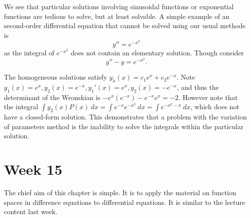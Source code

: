 \documentclass[a4paper, 12pt,oneside,openany]{book}
\begin{document}

We see that particular solutions involving sinusoidal functions or exponential functions are tedious to solve, but at least solvable. A simple example of an second-order differential equation that cannot be solved using our usual methods is $$y'' = e^{-x^2}$$ as the integral of $e^{-x^2}$ does not contain an elementary solution. Though consider $$y''-y = e^{-x^2}.$$ 

The homogeneous solutions satisfy $y_h(x)=c_1 e^x+c_2 e^{-x}$. Note $y_1(x)=e^x, y_2(x)=e^{-x}, y_1'(x)=e^x, y_2(x)=-e^{-x}$, and thus the determinant of the Wronskian is $-e^x(e^{-x})-e^{-x} e^x=-2$. However note that the integral $\int y_2(x) P(x)\ dx = \int e^{-x} e^{-x^2}\ dx=\int e^{-x^2-x}\ dx$, which does not have a closed-form solution. This demonstrates that a problem with the variation of parameters method is the inability to solve the integrals within the particular solution.

\chapter{Week 15}

The chief aim of this chapter is simple. It is to apply the material on function spaces in difference equations to differential equations. It is similar to the lecture content last week.
\end{document}

